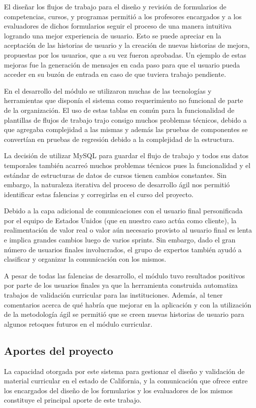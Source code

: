 El diseñar los flujos de trabajo para el diseño y revisión de formularios de competencias, cursos, y programas permitió a los profesores encargados y a los evaluadores de dichos formularios seguir el proceso de una manera intuitiva logrando una mejor experiencia de usuario. Esto se puede apreciar en la aceptación de las historias de usuario y la creación de nuevas historias de mejora, propuestas por los usuarios, que a su vez fueron aprobadas. Un ejemplo de estas mejoras fue la generación de mensajes en cada paso para que el usuario pueda acceder en su buzón de entrada en caso de que tuviera trabajo pendiente.

En el desarrollo del módulo se utilizaron muchas de las tecnologías y herramientas que disponía el sistema como requerimiento no funcional de parte de la organización. El uso de estas tablas en común para la funcionalidad de plantillas de flujos de trabajo trajo consigo muchos problemas técnicos, debido a que agregaba complejidad a las mismas y además las pruebas de componentes se convertían en pruebas de regresión debido a la complejidad de la estructura. 

La decisión de utilizar MySQL para guardar el flujo de trabajo y todos sus datos temporales también acarreó muchos problemas técnicos pues la funcionalidad y el estándar de estructuras de datos de cursos tienen cambios constantes. Sin embargo, la naturaleza iterativa del proceso de desarrollo ágil nos permitió identificar estas falencias y corregirlas en el curso del proyecto.

Debido a la capa adicional de comunicaciones con el usuario final personificada por el equipo de Estados Unidos (que en nuestro caso actúa como cliente), la realimentación de valor real o valor aún necesario provisto al usuario final es lenta e implica grandes cambios luego de varios sprints. Sin embargo, dado el gran número de usuarios finales involucrados, el grupo de expertos también ayudó a clasificar y organizar la comunicación con los mismos.

A pesar de todas las falencias de desarrollo, el módulo tuvo resultados positivos por parte de los usuarios finales ya que la herramienta construida automatiza trabajos de validación curricular para las instituciones. Además, al tener comentarios acerca de qué habría que mejorar en la aplicación y con la utilización de la metodología ágil se permitió que se creen nuevas historias de usuario para algunos retoques futuros en el módulo curricular. 

\subsection{Aportes del proyecto}
La capacidad otorgada por este sistema para gestionar el diseño y validación de material curricular en el estado de California, y la comunicación que ofrece entre los encargados del diseño de los formularios y los evaluadores de los mismos constituye el principal aporte de este trabajo.

